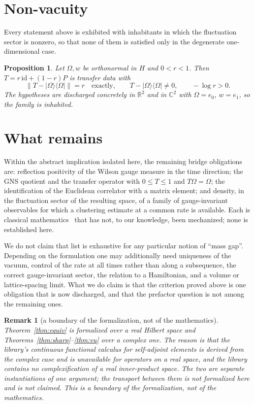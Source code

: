 \documentclass[11pt]{article}
\newtheorem{proposition}[theorem]{Proposition}
\newtheorem{remark}[theorem]{Remark}
\theoremstyle{definition}
\newcommand{\R}{\mathbb{R}}
\newcommand{\C}{\mathbb{C}}
\newcommand{\Om}{\Omega}
\newcommand{\ket}[1]{|#1\rangle}
\newcommand{\bra}[1]{\langle #1|}
\begin{document}
\section{Non-vacuity}

Every statement above is exhibited with inhabitants in which the
fluctuation sector is nonzero, so that none of them is satisfied only in
the degenerate one-dimensional case.

\begin{proposition}
\label{prop:nonvac}
Let $\Om, w$ be orthonormal in $H$ and $0 < r < 1$.  Then
$T = r\,\mathrm{id} + (1-r)P$ is transfer data with
\[
  \|T - \ket{\Om}\bra{\Om}\| = r \quad\text{exactly},\qquad
  T - \ket{\Om}\bra{\Om} \neq 0,\qquad -\log r > 0 .
\]
The hypotheses are discharged concretely in $\R^2$ and in $\C^2$ with
$\Om = e_0$, $w = e_1$, so the family is inhabited.
\end{proposition}

\section{What remains}

Within the abstract implication isolated here, the remaining bridge
obligations are: reflection positivity of the Wilson gauge measure in the
time direction; the GNS quotient and the transfer operator with
$0 \le T \le 1$ and $T\Om = \Om$; the identification of the Euclidean
correlator with a matrix element; and density, in the fluctuation sector
of the resulting space, of a family of gauge-invariant observables for
which a clustering estimate at a common rate is available.  Each is
classical mathematics~\cite{OsterwalderSeiler,GlimmJaffe} that has not, to
our knowledge, been mechanized; none is established here.

We do not claim that list is exhaustive for any particular notion of
``mass gap''.  Depending on the formulation one may additionally need
uniqueness of the vacuum, control of the rate at all times rather than
along a subsequence, the correct gauge-invariant sector, the relation to
a Hamiltonian, and a volume or lattice-spacing limit.  What we do claim
is that the criterion proved above is one obligation that is now
discharged, and that the prefactor question is not among the remaining
ones.

\begin{remark}[a boundary of the formalization, not of the mathematics]
\label{rem:RC}
Theorem~\ref{thm:equiv} is formalized over a real Hilbert space and
Theorems~\ref{thm:sharp}--\ref{thm:vu} over a complex one.  The reason is
that the library's continuous functional calculus for self-adjoint
elements is derived from the complex case and is unavailable for
operators on a real space, and the library contains no complexification
of a real inner-product space.  The two are separate instantiations of
one argument; the transport between them is not formalized here and is
not claimed.  This is a boundary of the formalization, not of the
mathematics.
\end{remark}
\end{document}
